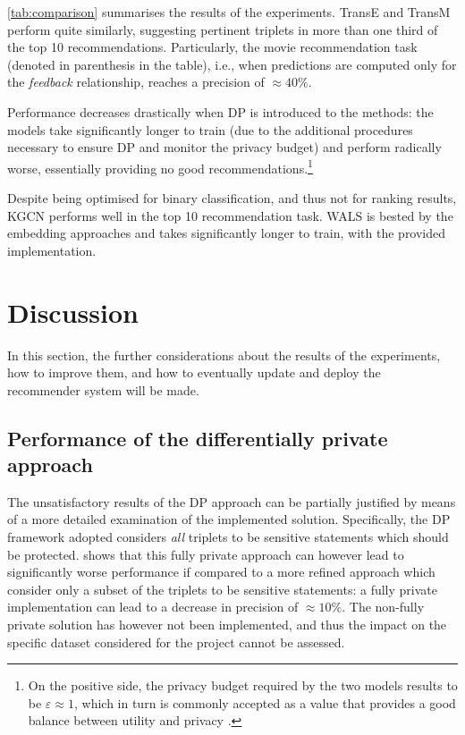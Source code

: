 \cref{tab:comparison} summarises the results of the experiments.
TransE and TransM perform quite similarly, suggesting pertinent triplets in more than one third of the top 10 recommendations.
Particularly, the movie recommendation task (denoted in parenthesis in the table), i.e., when predictions are computed only for the \emph{feedback} relationship, reaches a precision of $\approx{40}\%$.

Performance decreases drastically when DP is introduced to the methods: the models take significantly longer to train (due to the additional procedures necessary to ensure DP and monitor the privacy budget) and perform radically worse, essentially providing no good recommendations.\footnote{On the positive side, the privacy budget required by the two models results to be $\varepsilon \approx 1$, which in turn is commonly accepted as a value that provides a good balance between utility and privacy \parencite{lee2011much}.}

Despite being optimised for binary classification, and thus not for ranking results, KGCN performs well in the top 10 recommendation task.
WALS is bested by the embedding approaches and takes significantly longer to train, with the provided implementation.

\section{Discussion}\label{sec:discussion}

In this section, the further considerations about the results of the experiments, how to improve them, and how to eventually update and deploy the recommender system will be made.


\subsection{Performance of the differentially private approach}

The unsatisfactory results of the DP approach can be partially justified by means of a more detailed examination of the implemented solution.
Specifically, the DP framework adopted considers \emph{all} triplets to be sensitive statements which should be protected.
\cite{han2022framework} shows that this fully private approach can however lead to significantly worse performance if compared to a more refined approach which consider only a subset of the triplets to be sensitive statements: a fully private implementation can lead to a decrease in precision of $\approx 10\%$.
The non-fully private solution has however not been implemented, and thus the impact on the specific dataset considered for the project cannot be assessed.


